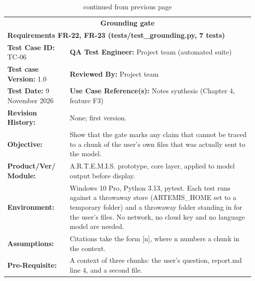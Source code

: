 \documentclass{FastFyp}
\begin{document}
{\small
{}
\begin{longtable}{|p{2.4cm}p{5.0cm}p{2.4cm}p{3.8cm}|}
\caption{Test case TC-06: grounding gate.}\label{tab:tc6}\\*
\endfirsthead
\caption[]{continued from previous page}\\*
\endhead
\hline
\multicolumn{4}{|c|}{\textbf{Grounding gate}} \\* \hline
\multicolumn{4}{|p{14.8cm}|}{\textbf{Requirements FR-22, FR-23 (tests/test\_grounding.py, 7 tests)}} \\* \hline
\multicolumn{2}{|p{7.8cm}|}{\textbf{Test Case ID:} TC-06} &
  \multicolumn{2}{p{6.6cm}|}{\textbf{QA Test Engineer:} Project team (automated suite)} \\* \hline
\multicolumn{2}{|p{7.8cm}|}{\textbf{Test case Version:} 1.0} &
  \multicolumn{2}{p{6.6cm}|}{\textbf{Reviewed By:} Project team} \\* \hline
\multicolumn{2}{|p{7.8cm}|}{\textbf{Test Date:} 9 November 2026} &
  \multicolumn{2}{p{6.6cm}|}{\textbf{Use Case Reference(s):} Notes synthesis (Chapter 4, feature F3)} \\ \hline
\multicolumn{1}{|p{2.4cm}|}{\textbf{Revision History:}} &
  \multicolumn{3}{p{12.0cm}|}{None; first version.} \\ \hline
\multicolumn{1}{|p{2.4cm}|}{\textbf{Objective:}} &
  \multicolumn{3}{p{12.0cm}|}{Show that the gate marks any claim that cannot be traced to a chunk of the user's own files that was actually sent to the model.} \\ \hline
\multicolumn{1}{|p{2.4cm}|}{\textbf{Product/Ver/ Module:}} &
  \multicolumn{3}{p{12.0cm}|}{A.R.T.E.M.I.S. prototype, core layer, applied to model output before display.} \\ \hline
\multicolumn{1}{|p{2.4cm}|}{\textbf{Environment:}} &
  \multicolumn{3}{p{12.0cm}|}{Windows 10 Pro, Python 3.13, pytest. Each test runs against a throwaway store (ARTEMIS\_HOME set to a temporary folder) and a throwaway folder standing in for the user's files. No network, no cloud key and no language model are needed.} \\ \hline
\multicolumn{1}{|p{2.4cm}|}{\textbf{Assumptions:}} &
  \multicolumn{3}{p{12.0cm}|}{Citations take the form [n], where n numbers a chunk in the context.} \\ \hline
\multicolumn{1}{|p{2.4cm}|}{\textbf{Pre-Requisite:}} &
  \multicolumn{3}{p{12.0cm}|}{A context of three chunks: the user's question, report.md line 4, and a second file.} \\ \hline

\end{longtable}}
\end{document}
